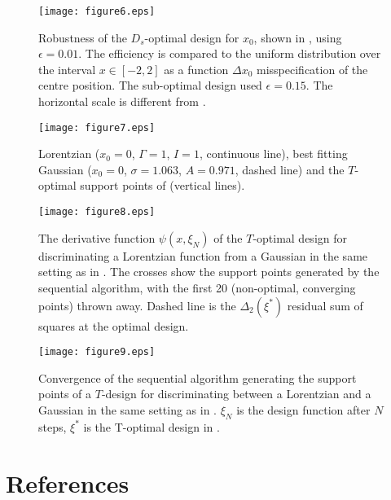 \documentclass[12pt]{iopart}
\begin{document}
\begin{figure}
\texttt{[image: figure6.eps]}
\caption{Robustness of the $D_s$-optimal design for $x_0$, shown in , using $\epsilon = 0.01$. The efficiency is compared to the uniform distribution over the interval $x\in [-2,2]$ as a function $\Delta x_0$ misspecification of the centre position. The sub-optimal design used $\epsilon = 0.15$. The horizontal scale is different from .}
\label{fig:dsx0robust}
\end{figure}

\begin{figure}
\texttt{[image: figure7.eps]}
\caption{Lorentzian ($x_0 = 0$, $\Gamma = 1$, $I = 1$, continuous line), best fitting Gaussian ($x_0 = 0$, $\sigma = 1.063$, $A = 0.971$, dashed line) and the $T$-optimal support points of  (vertical lines).}
\label{fig:lorgauss}
\end{figure}

\begin{figure}
\texttt{[image: figure8.eps]}
\caption{The derivative function $\psi(x, \xi_N)$ of the $T$-optimal design for discriminating a Lorentzian function from a Gaussian in the same setting as in . The crosses show the support points generated by the sequential algorithm, with the first 20 (non-optimal, converging points) thrown away. Dashed line is the $\Delta_2(\xi^*)$ residual sum of squares at the optimal design.}
\label{fig:topt}
\end{figure}

\begin{figure}
\texttt{[image: figure9.eps]}
\caption{Convergence of the sequential algorithm generating the support points of a $T$-design for discriminating between a Lorentzian and a Gaussian in the same setting as in . $\xi_N$ is the design function after $N$ steps, $\xi^*$ is the T-optimal design in .}
\end{figure}


\section*{References}


\end{document}
